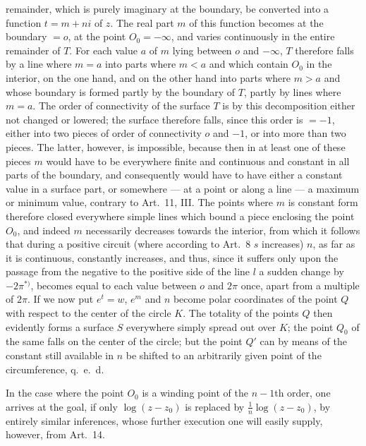 \documentclass{article}
\begin{document}
remainder, which is purely imaginary at the boundary, be converted into a function $t = m + ni$ of $z$. The real part $m$ of this function becomes at the boundary $= o$, at the point $O_0 = -\infty$, and varies continuously in the entire remainder of $T$. For each value $a$ of $m$ lying between $o$ and $-\infty$, $T$ therefore falls by a line where $m = a$ into parts where $m < a$ and which contain $O_0$ in the interior, on the one hand, and on the other hand into parts where $m > a$ and whose boundary is formed partly by the boundary of $T$, partly by lines where $m = a$. The order of connectivity of the surface $T$ is by this decomposition either not changed or lowered; the surface therefore falls, since this order is $= -1$, either into two pieces of order of connectivity $o$ and $-1$, or into more than two pieces. The latter, however, is impossible, because then in at least one of these pieces $m$ would have to be everywhere finite and continuous and constant in all parts of the boundary, and consequently would have to have either a constant value in a surface part, or somewhere --- at a point or along a line --- a maximum or minimum value, contrary to Art.~11, III. The points where $m$ is constant form therefore closed everywhere simple lines which bound a piece enclosing the point $O_0$, and indeed $m$ necessarily decreases towards the interior, from which it follows that during a positive circuit (where according to Art.~8 $s$ increases) $n$, as far as it is continuous, constantly increases, and thus, since it suffers only upon the passage from the negative to the positive side of the line $l$ a sudden change by $-2\pi^{*)}$, becomes equal to each value between $o$ and $2\pi$ once, apart from a multiple of $2\pi$. If we now put $e^t = w$, $e^m$ and $n$ become polar coordinates of the point $Q$ with respect to the center of the circle $K$. The totality of the points $Q$ then evidently forms a surface $S$ everywhere simply spread out over $K$; the point $Q_0$ of the same falls on the center of the circle; but the point $Q'$ can by means of the constant still available in $n$ be shifted to an arbitrarily given point of the circumference, q.\ e.\ d.

In the case where the point $O_0$ is a winding point of the $n-1$th order, one arrives at the goal, if only $\log(z - z_0)$ is replaced by $\frac{1}{n}\log(z - z_0)$, by entirely similar inferences, whose further execution one will easily supply, however, from Art.~14.
\end{document}
